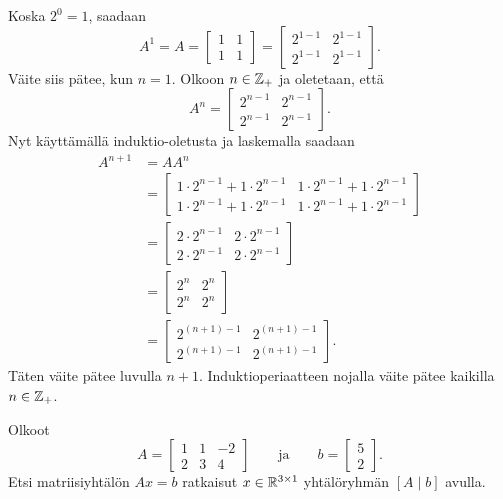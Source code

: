 \documentclass[11pt,a4paper]{amsart}
\begin{document}
\begin{solution}
  Koska \(2^0 = 1\), saadaan
  \[
    A^1 = A =
    \begin{bmatrix}
      1 & 1 \\
      1 & 1
    \end{bmatrix}
    =
    \begin{bmatrix}
      2^{1 - 1} & 2^{1 - 1} \\
      2^{1 - 1} & 2^{1 - 1}
    \end{bmatrix}.
  \]
  Väite siis pätee, kun \(n = 1\). Olkoon \(n \in \mathbb{Z}_{+}\) ja
  oletetaan, että
  \[
    A^n =
    \begin{bmatrix}
      2^{n - 1} & 2^{n - 1} \\
      2^{n - 1} & 2^{n - 1}
    \end{bmatrix}.
  \]
  Nyt käyttämällä induktio-oletusta ja laskemalla saadaan
  \[
    \begin{aligned}
      A^{n + 1} &= AA^n \\
      &=
      \begin{bmatrix}
        1 \cdot 2^{n - 1} + 1 \cdot 2^{n - 1} & 1 \cdot 2^{n - 1} + 1
        \cdot 2^{n - 1} \\
        1 \cdot 2^{n - 1} + 1 \cdot 2^{n - 1} & 1 \cdot 2^{n - 1} + 1
        \cdot 2^{n - 1}
      \end{bmatrix} \\
      &=
      \begin{bmatrix}
        2 \cdot 2^{n - 1} & 2 \cdot 2^{n - 1} \\
        2 \cdot 2^{n - 1} & 2 \cdot 2^{n - 1}
      \end{bmatrix} \\
      &=
      \begin{bmatrix}
        2^n & 2^n \\
        2^n & 2^n
      \end{bmatrix} \\
      &=
      \begin{bmatrix}
        2^{(n + 1) - 1} & 2^{(n + 1) - 1} \\
        2^{(n + 1) - 1} & 2^{(n + 1) - 1}
      \end{bmatrix}.
    \end{aligned}
  \]
  Täten väite pätee luvulla \(n + 1\). Induktioperiaatteen nojalla väite
  pätee kaikilla \(n \in \mathbb{Z}_{+}\).
\end{solution}

\begin{exercise}
  Olkoot
  \[
    A =
    \begin{bmatrix}
      1 & 1 & -2 \\
      2 & 3 & 4
    \end{bmatrix}
    \qquad\text{ja}\qquad
    b =
    \begin{bmatrix} 5 \\ 2
    \end{bmatrix}.
  \]
  Etsi matriisiyhtälön \(Ax=b\) ratkaisut \(x \in \mathbb{R}^{3\times 1}\)
  yhtälöryhmän \([A \mid b]\) avulla.
\end{exercise}
\end{document}
